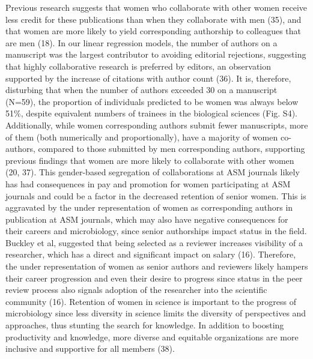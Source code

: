 \documentclass[11pt,]{article}
\begin{document}
Previous research suggests that women who collaborate with other women
receive less credit for these publications than when they collaborate
with men (35), and that women are more likely to yield corresponding
authorship to colleagues that are men (18). In our linear regression
models, the number of authors on a manuscript was the largest
contributor to avoiding editorial rejections, suggesting that highly
collaborative research is preferred by editors, an observation supported
by the increase of citations with author count (36). It is, therefore,
disturbing that when the number of authors exceeded 30 on a manuscript
(N=59), the proportion of individuals predicted to be women was always
below 51\%, despite equivalent numbers of trainees in the biological
sciences (Fig. S4). Additionally, while women corresponding authors
submit fewer manuscripts, more of them (both numerically and
proportionally), have a majority of women co-authors, compared to those
submitted by men corresponding authors, supporting previous findings
that women are more likely to collaborate with other women (20, 37).
This gender-based segregation of collaborations at ASM journals likely
has had consequences in pay and promotion for women participating at ASM
journals and could be a factor in the decreased retention of senior
women. This is aggravated by the under representation of women as
corresponding authors in publication at ASM journals, which may also
have negative consequences for their careers and microbiology, since
senior authorships impact status in the field. Buckley et al, suggested
that being selected as a reviewer increases visibility of a researcher,
which has a direct and significant impact on salary (16). Therefore, the
under representation of women as senior authors and reviewers likely
hampers their career progression and even their desire to progress since
status in the peer review process also signals adoption of the
researcher into the scientific community (16). Retention of women in
science is important to the progress of microbiology since less
diversity in science limits the diversity of perspectives and
approaches, thus stunting the search for knowledge. In addition to
boosting productivity and knowledge, more diverse and equitable
organizations are more inclusive and supportive for all members (38).
\end{document}
